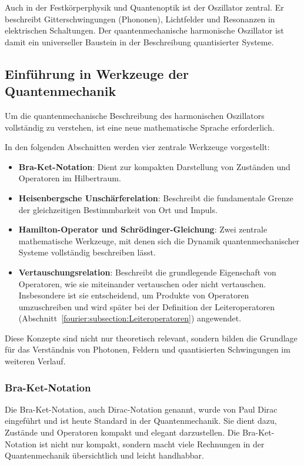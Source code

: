 	Auch in der Festkörperphysik und Quantenoptik ist der Oszillator zentral.
	Er beschreibt Gitterschwingungen (Phononen), Lichtfelder und Resonanzen in elektrischen Schaltungen.
	Der quantenmechanische harmonische Oszillator ist damit ein universeller Baustein in der Beschreibung quantisierter Systeme.

\subsection{Einführung in Werkzeuge der Quantenmechanik\label{fourier:subsection:werkzeugeQuantenmechanik}}
	Um die quantenmechanische Beschreibung des harmonischen Oszillators vollständig zu verstehen, ist eine neue mathematische Sprache erforderlich.
	
	In den folgenden Abschnitten werden vier zentrale Werkzeuge vorgestellt:
	\begin{itemize}
		\item \textbf{Bra-Ket-Notation}:
		Dient zur kompakten Darstellung von Zuständen und Operatoren im Hilbertraum.

		\item \textbf{Heisenbergsche Unschärferelation}:
		Beschreibt die fundamentale Grenze der gleichzeitigen Bestimmbarkeit von Ort und Impuls.

		\item \textbf{Hamilton-Operator und Schrödinger-Gleichung}:
		Zwei zentrale mathematische Werkzeuge, mit denen sich die Dynamik quantenmechanischer Systeme vollständig beschreiben lässt.
		
		\item \textbf{Vertauschungsrelation}:
		Beschreibt die grundlegende Eigenschaft von Operatoren, wie sie miteinander vertauschen oder nicht vertauschen.
		Insbesondere ist sie entscheidend, um Produkte von Operatoren umzuschreiben und wird später bei der Definition der Leiteroperatoren (Abschnitt~\ref{fourier:subsection:Leiteroperatoren}) angewendet.
	\end{itemize}

	Diese Konzepte sind nicht nur theoretisch relevant, sondern bilden die Grundlage für das Verständnis von Photonen, Feldern und quantisierten Schwingungen im weiteren Verlauf.

	\subsubsection{Bra-Ket-Notation\label{fourier:subsubsection:braKetNotation}}
		Die Bra-Ket-Notation, auch Dirac-Notation genannt, wurde von Paul Dirac eingeführt und ist heute Standard in der Quantenmechanik.
		Sie dient dazu, Zustände und Operatoren kompakt und elegant darzustellen.
		Die Bra-Ket-Notation ist nicht nur kompakt, sondern macht viele Rechnungen in der Quantenmechanik übersichtlich und leicht handhabbar.

